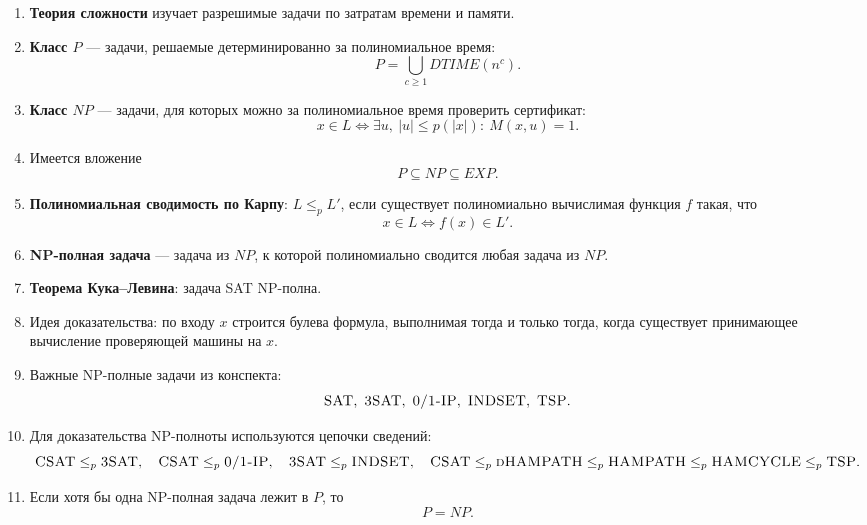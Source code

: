 \documentclass[12pt,a4paper]{article}
\theoremstyle{definition}
\theoremstyle{plain}
\begin{document}
\begin{enumerate}
\item \textbf{Теория сложности} изучает разрешимые задачи по затратам времени и памяти.
\item \textbf{Класс $P$} --- задачи, решаемые детерминированно за полиномиальное время:
\[
P=\bigcup_{c\ge1}DTIME(n^c).
\]
\item \textbf{Класс $NP$} --- задачи, для которых можно за полиномиальное время проверить сертификат:
\[
x\in L\iff \exists u,\ |u|\le p(|x|):\ M(x,u)=1.
\]
\item Имеется вложение
\[
P\subseteq NP\subseteq EXP.
\]
\item \textbf{Полиномиальная сводимость по Карпу}: $L\le_pL'$, если существует полиномиально вычислимая функция $f$ такая, что
\[
x\in L\iff f(x)\in L'.
\]
\item \textbf{NP-полная задача} --- задача из $NP$, к которой полиномиально сводится любая задача из $NP$.
\item \textbf{Теорема Кука--Левина}: задача \textsc{SAT} NP-полна.
\item Идея доказательства: по входу $x$ строится булева формула, выполнимая тогда и только тогда, когда существует принимающее вычисление проверяющей машины на $x$.
\item Важные NP-полные задачи из конспекта:
\[
\textsc{SAT},\ \textsc{3SAT},\ \textsc{0/1-IP},\ \textsc{INDSET},\ \textsc{TSP}.
\]
\item Для доказательства NP-полноты используются цепочки сведений:
\[
\textsc{CSAT}\le_p \textsc{3SAT},\quad
\textsc{CSAT}\le_p \textsc{0/1-IP},\quad
\textsc{3SAT}\le_p \textsc{INDSET},\quad
\textsc{CSAT}\le_p \textsc{dHAMPATH}\le_p \textsc{HAMPATH}\le_p \textsc{HAMCYCLE}\le_p \textsc{TSP}.
\]
\item Если хотя бы одна NP-полная задача лежит в $P$, то
\[
P=NP.
\]
\end{enumerate}
\end{document}

